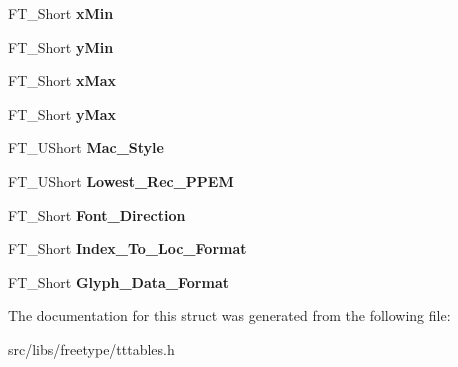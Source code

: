 \begin{DoxyCompactItemize}
\item 
\hypertarget{struct_t_t___header___ae4553d76427d9f7a28595ed71897dcbb}{
FT\_\-Short {\bfseries xMin}}
\label{struct_t_t___header___ae4553d76427d9f7a28595ed71897dcbb}

\item 
\hypertarget{struct_t_t___header___ac6aad4966bac8a96c5bc48765b3d694a}{
FT\_\-Short {\bfseries yMin}}
\label{struct_t_t___header___ac6aad4966bac8a96c5bc48765b3d694a}

\item 
\hypertarget{struct_t_t___header___a593b9cc3e11532972a7fc96944dd1ae9}{
FT\_\-Short {\bfseries xMax}}
\label{struct_t_t___header___a593b9cc3e11532972a7fc96944dd1ae9}

\item 
\hypertarget{struct_t_t___header___a02d236cd8150c00e886a0c487c04dffa}{
FT\_\-Short {\bfseries yMax}}
\label{struct_t_t___header___a02d236cd8150c00e886a0c487c04dffa}

\item 
\hypertarget{struct_t_t___header___a82f2a5a836b802e44ff712b3afc8745c}{
FT\_\-UShort {\bfseries Mac\_\-Style}}
\label{struct_t_t___header___a82f2a5a836b802e44ff712b3afc8745c}

\item 
\hypertarget{struct_t_t___header___a1d20801c3482dee2529d294441ed9af3}{
FT\_\-UShort {\bfseries Lowest\_\-Rec\_\-PPEM}}
\label{struct_t_t___header___a1d20801c3482dee2529d294441ed9af3}

\item 
\hypertarget{struct_t_t___header___a1cb7d8a2a76ae1acda3ac94bcd555954}{
FT\_\-Short {\bfseries Font\_\-Direction}}
\label{struct_t_t___header___a1cb7d8a2a76ae1acda3ac94bcd555954}

\item 
\hypertarget{struct_t_t___header___a05a488607bfae319de096b4bd9cf8c6d}{
FT\_\-Short {\bfseries Index\_\-To\_\-Loc\_\-Format}}
\label{struct_t_t___header___a05a488607bfae319de096b4bd9cf8c6d}

\item 
\hypertarget{struct_t_t___header___adeeedce4bb708c3e068ed80366ec921d}{
FT\_\-Short {\bfseries Glyph\_\-Data\_\-Format}}
\label{struct_t_t___header___adeeedce4bb708c3e068ed80366ec921d}

\end{DoxyCompactItemize}


The documentation for this struct was generated from the following file:\begin{DoxyCompactItemize}
\item 
src/libs/freetype/tttables.h\end{DoxyCompactItemize}

